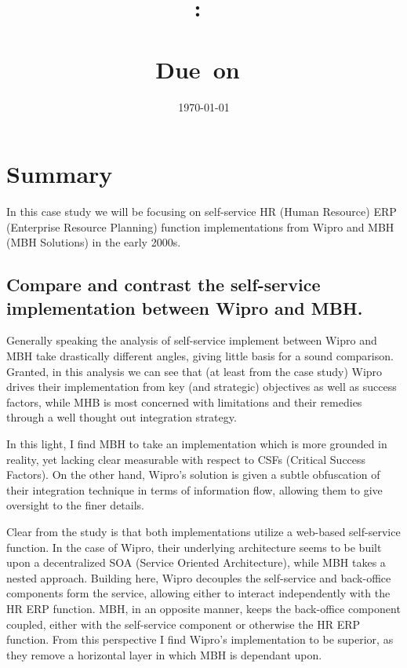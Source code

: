 \documentclass{article}
\title{
    \vspace{2in}
    \textmd{\textbf{\hmwkClass:\ \\ \hmwkTitle}}\\
    \normalsize\vspace{0.1in}\small{Due\ on\ \hmwkDueDate}\\
    \vspace{0.1in}\Large{\textit{\paprTitle}}
    \vspace{3in}
}
\author{\hmwkAuthorName}
\date{\today}
\begin{document}
\maketitle

\pagebreak

\tableofcontents
\newpage

\section{Summary}
In this case study we will be focusing on self-service HR (Human Resource) ERP (Enterprise Resource Planning) function implementations from Wipro and MBH (MBH Solutions) in the early 2000s. 

\subsection{Compare and contrast the self-service implementation between Wipro and MBH.}
Generally speaking the analysis of self-service implement between Wipro and MBH take drastically different angles, giving little basis for a sound comparison. 
Granted, in this analysis we can see that (at least from the case study) Wipro drives their implementation from key (and strategic) objectives as well as success factors, while MHB is most concerned with limitations and their remedies through a well thought out integration strategy.

In this light, I find MBH to take an implementation which is more grounded in reality, yet lacking clear measurable with respect to CSFs (Critical Success Factors).
On the other hand, Wipro's solution is given a subtle obfuscation of their integration technique in terms of information flow, allowing them to give oversight to the finer details. 

Clear from the study is that both implementations utilize a web-based self-service function.
In the case of Wipro, their underlying architecture seems to be built upon a decentralized SOA (Service Oriented Architecture), while MBH takes a nested approach. 
Building here, Wipro decouples the self-service and back-office components form the service, allowing either to interact independently with the HR ERP function. 
MBH, in an opposite manner, keeps the back-office component coupled, either with the self-service component or otherwise the HR ERP function.
From this perspective I find Wipro's implementation to be superior, as they remove a horizontal layer in which MBH is dependant upon. 
\end{document}
